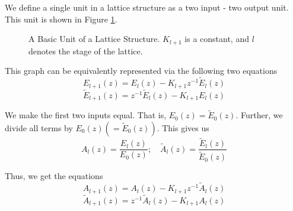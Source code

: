 \documentclass{article}
\theoremstyle{definition}
\begin{document}
We define a single unit in a lattice structure as a two input - two output unit. This unit is shown in Figure \ref{fig:lattice_1}. 

\begin{figure}[!h]
  \centering
  \caption{A Basic Unit of a Lattice Structure. $K_{l+1}$ is a constant, and $l$ denotes the stage of the lattice.} 
  \label{fig:lattice_1}
\end{figure}

This graph can be equivalently represented via the following two equations
\[
    E_{l+1}(z) = E_l(z) - K_{l+1} z^{-1} \widetilde{E}_{l}(z)
\]
\[
    \widetilde{E}_{l+1}(z) = z^{-1} \widetilde{E}_{l}(z) - K_{l+1} E_l(z)
\]

We make the first two inputs equal. That is, $E_0(z) = \widetilde{E}_{0}(z)$. Further, we divide all terms by $E_0(z) ( = \widetilde{E}_0(z))$. This gives us 
\[
    A_l(z) = \frac{E_l(z)}{E_0(z)} ; \quad \widetilde{A}_{l}(z) = \frac{\widetilde{E}_{l}(z)}{\widetilde{E}_{0}(z)} 
\]

Thus, we get the equations 
\[
    A_{l+1}(z) = A_l(z) - K_{l+1} z^{-1} \widetilde{A}_{l}(z)
\]
\[
    \widetilde{A}_{l+1}(z) = z^{-1} \widetilde{A}_{l}(z) - K_{l+1} A_l(z)
\]
\end{document}
